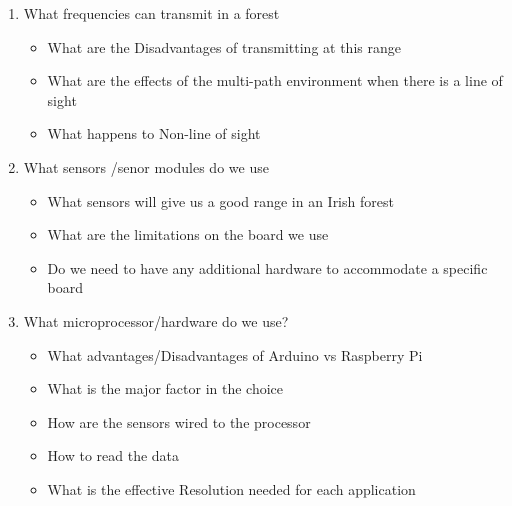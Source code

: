 		\begin{enumerate}
			\item What frequencies can transmit in a forest
			\begin{itemize}
				\item What are the Disadvantages of transmitting at this range
				\item What are the effects of the multi-path environment when there is a line of sight
				\item What happens to Non-line of sight
			\end{itemize}
			\item What sensors /senor modules do we use
			\begin{itemize}
				\item What sensors will give us a good range in an Irish forest
				\item What are the limitations on the board we use
				\item Do we need to  have any additional hardware to  accommodate a specific board 
			\end{itemize}
			\item What microprocessor/hardware do we use?
			\begin{itemize}
				\item What advantages/Disadvantages of  Arduino vs Raspberry Pi
				\item What is the major factor in the choice 
				\item How are the sensors wired to the processor 
				\item How to read the  data
				\item What is the effective Resolution needed for each application
			\end{itemize}
			
		\end{enumerate}
	\newpage
